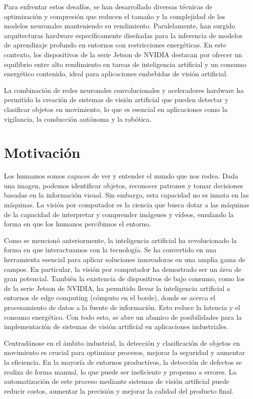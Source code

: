 \documentclass[11pt,spanish,listoffigures,listoftables]{tfgetsinf}
\begin{document}
Para enfrentar estos desafíos, se han desarrollado diversas técnicas de optimización y compresión que reducen el tamaño y la complejidad de los modelos neuronales manteniendo su rendimiento. Paralelamente, han surgido arquitecturas hardware específicamente diseñadas para la inferencia de modelos de aprendizaje profundo en entornos con restricciones energéticas. En este contexto, los dispositivos de la serie Jetson de NVIDIA destacan por ofrecer un equilibrio entre alto rendimiento en tareas de inteligencia artificial y un consumo energético contenido, ideal para aplicaciones embebidas de visión artificial.

La combinación de redes neuronales convolucionales y aceleradores hardware ha permitido la creación de sistemas de visión artificial que pueden detectar y clasificar objetos en movimiento, lo que es esencial en aplicaciones como la vigilancia, la conducción autónoma y la robótica.

\section{Motivaci\'on}

Los humamos somos capaces de ver y entender el mundo que nos rodea. Dada una imagen, podemos identificar objetos, reconocer patrones y tomar decisiones basadas en la información visual. Sin embargo, esta capacidad no es innata en las máquinas. La visión por computador es la ciencia que busca dotar a las máquinas de la capacidad de interpretar y comprender imágenes y vídeos, emulando la forma en que los humanos percibimos el entorno. 

Como se mencionó anteriormente, la inteligencia artificial ha revolucionado la forma en que interactuamos con la tecnología. Se ha convertido en una herramienta esencial para aplicar soluciones innovadoras en una amplia gama de campos. En particular, la visión por computador ha demostrado ser un área de gran potencial. También la existencia de dispositivos de bajo consumo, como los de la serie Jetson de NVIDIA, ha permitido llevar la inteligencia artificial a entornos de edge computing (cómputo en el borde), donde se acerca el procesamiento de datos a la fuente de información. Esto reduce la latencia y el consumo energético. Con todo esto, se abre un abanico de posibilidades para la implementación de sistemas de visión artificial en aplicaciones industriales.

Centradánose en el ámbito industrial, la detección y clasificación de objetos en movimiento es crucial para optimizar procesos, mejorar la seguridad y aumentar la eficiencia. En la mayoría de entornos productivos, la detección de defectos se realiza de forma manual, lo que puede ser ineficiente y propenso a errores. La automatización de este proceso mediante sistemas de visión artificial puede reducir costos, aumentar la precisión y mejorar la calidad del producto final.
\end{document}
